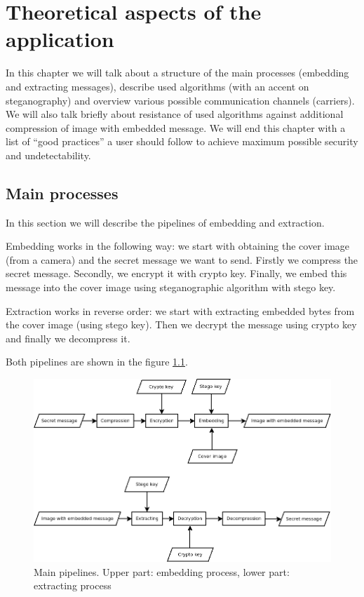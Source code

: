 \chapter{Theoretical aspects of the application}
\label{chap:theory}
In this chapter we will talk about a structure of the main
processes (embedding and extracting messages),
describe used algorithms (with an accent on steganography) and 
overview various possible communication channels (carriers).
We will also talk briefly about resistance of used algorithms
against additional compression of image with embedded message.
We will end this chapter with a list of ``good practices''
a user should follow to achieve maximum possible security
and undetectability.


\section{Main processes}
In this section we will describe
the pipelines of embedding and extraction. 

Embedding works in the following way: we start with obtaining the cover image
(from a camera) and the secret message we want to send. Firstly we compress 
the secret message. Secondly, we encrypt it with crypto key. Finally, we embed
this message into the cover image using steganographic algorithm with stego key.

Extraction works in reverse order: we start with extracting embedded bytes from
the cover image (using stego key). Then we decrypt the message using crypto key
and finally we decompress it. 

Both pipelines are shown in the figure \ref{img:CSflow}.

\begin{figure}
\centerline{\includegraphics[width=\textwidth]{diagrams/flow.png}}
\caption[Main pipelines]{Main pipelines. Upper part: embedding process, lower part: extracting process}
\label{img:CSflow}
\end{figure}


